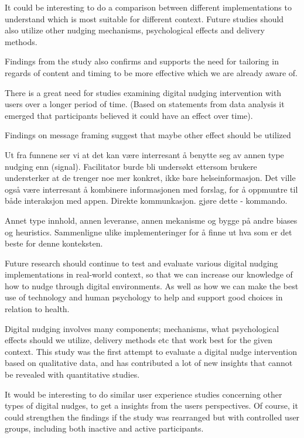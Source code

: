 It could be interesting to do a comparison between different implementations to understand which is most suitable for different context. Future studies should also utilize other nudging mechanisms, psychological effects and delivery methods. 

Findings from the study also confirms and supports the need for tailoring in regards of content and timing to be more effective which we are already aware of. 

There is a great need for studies examining digital nudging intervention with users over a longer period of time. (Based on statements from data analysis it emerged that participants believed it could have an effect over time).

Findings on message framing suggest that maybe other effect should be utilized 











Ut fra funnene ser vi at det kan være interresant å benytte seg av annen type nudging enn (signal). Facilitator burde bli undersøkt ettersom brukere understerker at de trenger noe mer konkret, ikke bare helseinformasjon. 
Det ville også være interresant å kombinere informasjonen med forslag, for å oppmuntre til både interaksjon med appen. Direkte kommunkasjon. gjøre dette - kommando. 

Annet type innhold, annen leveranse, annen mekanisme og bygge på andre biases og heuristics. 
Sammenligne ulike implementeringer for å finne ut hva som er det beste for denne konteksten. 

Future research should continue to test and evaluate various digital nudging implementations in real-world context, so that we can increase our knowledge of how to nudge through digital environments. As well as how we can make the best use of technology and human psychology to help and support good choices in relation to health. 

Digital nudging involves many components; mechanisms, what psychological effects should we utilize, delivery methods etc that work best for the given context. This study was the first attempt to evaluate a digital nudge intervention based on qualitative data, and has contributed a lot of new insights that cannot be revealed with quantitative studies.

It would be interesting to do similar user experience studies concerning other types of digital nudges, to get a insights from the users perspectives. Of course, it could strengthen the findings if the study was rearranged but with controlled user groups, including both inactive and active participants.   

